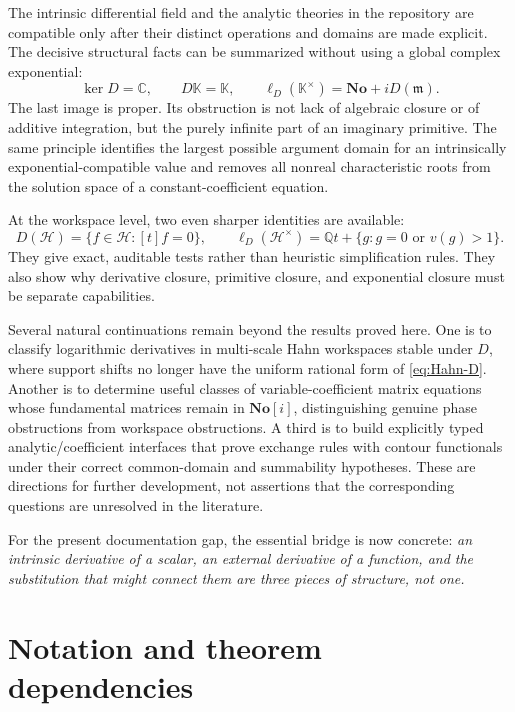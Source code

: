 \documentclass[11pt,a4paper]{article}
\numberwithin{equation}{section}
\theoremstyle{definition}
\theoremstyle{remark}
\newcommand{\No}{\mathbf{No}}
\newcommand{\K}{\mathbb K}
\newcommand{\C}{\mathbb C}
\newcommand{\Q}{\mathbb Q}
\newcommand{\mm}{\mathfrak m}
\newcommand{\HH}{\mathscr H}
\newcommand{\Dlog}{\ell_D}
\begin{document}
The intrinsic differential field and the analytic theories in the
repository are compatible only after their distinct operations and domains
are made explicit. The decisive structural facts can be summarized without
using a global complex exponential:
\[
 \ker D=\C,\qquad D\K=\K,\qquad
 \Dlog(\K^\times)=\No+iD(\mm).
\]
The last image is proper. Its obstruction is not lack of algebraic closure
or of additive integration, but the purely infinite part of an imaginary
primitive. The same principle identifies the largest possible argument
domain for an intrinsically exponential-compatible value and removes all
nonreal characteristic roots from the solution space of a
constant-coefficient equation.

At the workspace level, two even sharper identities are available:
\[
 D(\HH)=\{f\in\HH:[t]f=0\},\qquad
 \Dlog(\HH^\times)=\Q t+\{g:g=0\text{ or }v(g)>1\}.
\]
They give exact, auditable tests rather than heuristic simplification rules.
They also show why derivative closure, primitive closure, and exponential
closure must be separate capabilities.

Several natural continuations remain beyond the results proved here.
One is to classify logarithmic derivatives in multi-scale Hahn workspaces
stable under $D$, where support shifts no longer have the uniform rational
form of \eqref{eq:Hahn-D}. Another is to determine useful classes of
variable-coefficient matrix equations whose fundamental matrices remain in
$\No[i]$, distinguishing genuine phase obstructions from workspace
obstructions. A third is to build explicitly typed analytic/coefficient
interfaces that prove exchange rules with contour functionals under their
correct common-domain and summability hypotheses. These are directions for
further development, not assertions that the corresponding questions are
unresolved in the literature.

For the present documentation gap, the essential bridge is now concrete:
\emph{an intrinsic derivative of a scalar, an external derivative of a
function, and the substitution that might connect them are three pieces of
structure, not one.}

\appendix
\section{Notation and theorem dependencies}
\label{app:notation}
\end{document}
